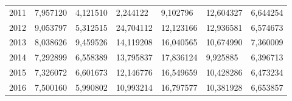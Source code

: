 \begin{table}
\begin{tabular}{p{1cm}p{2cm}p{2cm}p{2cm}p{2cm}p{2cm}p{2cm}}
 2011 &                         7,957120 &         4,121510 &                 2,244122 &                               9,102796 &                    12,604327 & 6,644254 \\
 2012 &                         9,053797 &         5,312515 &                24,704112 &                              12,123166 &                    12,936581 & 6,574673 \\
 2013 &                         8,038626 &         9,459526 &                14,119208 &                              16,040565 &                    10,674990 & 7,360009 \\
 2014 &                         7,292899 &         6,558389 &                13,795837 &                              17,836124 &                     9,925885 & 6,396713 \\
 2015 &                         7,326072 &         6,601673 &                12,146776 &                              16,549659 &                    10,428286 & 6,473234 \\
 2016 &                         7,500160 &         5,990802 &                10,993214 &                              16,797577 &                    10,381928 & 6,653857 \\
\bottomrule
\end{tabular}
\end{table}
